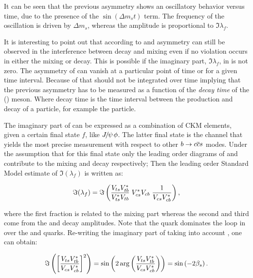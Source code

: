 \noindent It can be seen that the previous asymmetry shows an oscillatory behavior versus time, due
to the presence of the $\sin(\Delta m_s t)$ term. The frequency of the oscillation is driven by $\Delta m_s$,
whereas the amplitude is proportional to $\Im\lambda_f$.

It is interesting to point out that according to  and  \CP asymmetry
can still be observed in the interference between decay and
mixing even if no \CP violation occurs in either the mixing or decay. This is possible if the imaginary part,
$\Im\lambda_f$, in  is not zero. The asymmetry of  can vanish at a
particular point of time or for a given time interval. Because of that  should not
be integrated over time implying that the previous asymmetry has to be measured as a function of
the {\it decay time} of the \Bs (\Bsb) meson. Where decay time is the time interval between
the production and decay of a particle, for example the \Bs particle.

The imaginary part of  can be expressed as a combination of CKM elements,
given a certain final state $f$, like ${J\mskip -3mu/\mskip -2mu\psi\mskip 2mu}\phi$. The latter final state is the channel that
yields the most precise \phis measurement with respect to other $b \rightarrow c\overline {c}s$ modes.
Under the assumption that for this final state only the leading order diagrams of 
and  contribute to the \BBbarSyst mixing and decay respectively;
Then the leading order Standard Model estimate of $\Im(\lambda_f)$ is written as:

\begin{equation}
  \centering
 \Im(\lambda_f) = \Im\parenthesis{ \frac{\Vts\Vtb^*}{\Vts^*\Vtb} \; \Vcs^*\Vcb \; \frac{1}{\Vcs\Vcb^*} },
 \label{lambdaf_ckm}
\end{equation}

\noindent where the first fraction is related to the mixing part \qoverp whereas the second and third come from
the \Bsb and \Bs decay amplitudes. Note that the \tquark quark dominates the loop in  over the
\cquark and \uquark quarks. Re-writing the imaginary part of  taking into account
, one can obtain:

\begin{equation}
  \centering
  \Im\parenthesis{ \brackets{ \frac{\Vts\Vtb^*}{\Vcs\Vcb^*}}^2 } =
  \sin \parenthesis{2 \arg \parenthesis{\frac{\Vts\Vtb^*}{\Vcs\Vcb^*}}} =
  \sin \parenthesis{-2\betas}.
 \label{lambda_ckm_manip}
\end{equation}


